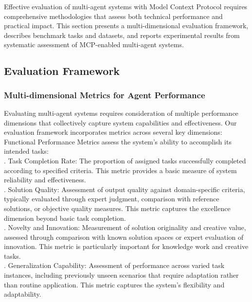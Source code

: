 Effective evaluation of multi-agent systems with Model Context Protocol requires comprehensive methodologies that assess both technical performance and practical impact. This section presents a multi-dimensional evaluation framework, describes benchmark tasks and datasets, and reports experimental results from systematic assessment of MCP-enabled multi-agent systems.\\
\subsection{Evaluation Framework}
\subsubsection{Multi-dimensional Metrics for Agent Performance}
Evaluating multi-agent systems requires consideration of multiple performance dimensions that collectively capture system capabilities and effectiveness. Our evaluation framework incorporates metrics across several key dimensions:\\ \newline
Functional Performance Metrics assess the system's ability to accomplish its intended tasks:\\ . Task Completion Rate: The proportion of assigned tasks successfully completed according to specified criteria. This metric provides a basic measure of system reliability and effectiveness.\\ . Solution Quality: Assessment of output quality against domain-specific criteria, typically evaluated through expert judgment, comparison with reference solutions, or objective quality measures. This metric captures the excellence dimension beyond basic task completion.\\ . Novelty and Innovation: Measurement of solution originality and creative value, assessed through comparison with known solution spaces or expert evaluation of innovation. This metric is particularly important for knowledge work and creative tasks.\\ . Generalization Capability: Assessment of performance across varied task instances, including previously unseen scenarios that require adaptation rather than routine application. This metric captures the system's flexibility and adaptability.\\ \newline
